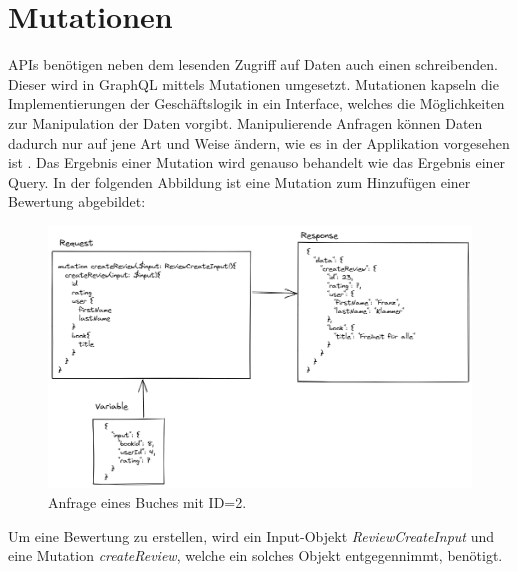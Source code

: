 
\section{Mutationen}
APIs benötigen neben dem lesenden Zugriff auf Daten auch einen schreibenden.
Dieser wird in GraphQL mittels Mutationen umgesetzt.
Mutationen kapseln die Implementierungen der Geschäftslogik in ein Interface, welches die Möglichkeiten zur Manipulation der Daten vorgibt.
Manipulierende Anfragen können Daten dadurch nur auf jene Art und Weise ändern, wie es in der Applikation vorgesehen ist \cite[S. 54]{kress2020graphql}.
Das Ergebnis einer Mutation wird genauso behandelt wie das Ergebnis einer Query.
\newline
In der folgenden Abbildung ist eine Mutation zum Hinzufügen einer Bewertung abgebildet:

\begin{figure}[H]
    \includegraphics[width=\textwidth]{pics/createReviewMutation.png}
    \caption{Anfrage eines Buches mit ID=2.}
\end{figure}

Um eine Bewertung zu erstellen, wird ein Input-Objekt \textit{ReviewCreateInput} und eine Mutation \textit{createReview}, welche ein solches Objekt entgegennimmt, benötigt.

